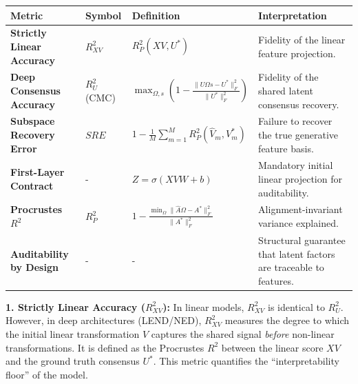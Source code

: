\documentclass[
  letterpaper,
]{report}
\newcounter{none} %
\begin{document}
{\def\LTcaptype{none} %
\begin{longtable}[]{@{}
  >{\raggedright\arraybackslash}p{}
  >{\centering\arraybackslash}p{}
  >{\raggedright\arraybackslash}p{}
  >{\raggedright\arraybackslash}p{}@{}}
\toprule\noalign{}
\begin{minipage}[b]{\linewidth}\raggedright
Metric
\end{minipage} & \begin{minipage}[b]{\linewidth}\centering
Symbol
\end{minipage} & \begin{minipage}[b]{\linewidth}\raggedright
Definition
\end{minipage} & \begin{minipage}[b]{\linewidth}\raggedright
Interpretation
\end{minipage} \\
\midrule\noalign{}
\endhead
\bottomrule\noalign{}
\endlastfoot
\textbf{Strictly Linear Accuracy} & \(R^2_{XV}\) & \(R^2_P(X V, U^*)\) &
Fidelity of the linear feature projection. \\
\textbf{Deep Consensus Accuracy} & \(R^2_U\) (CMC) &
\(\max_{\Omega, s} \left( 1 - \frac{\|\hat{U}\Omega s - U^*\|_F^2}{\|U^*\|_F^2} \right)\)
& Fidelity of the shared latent consensus recovery. \\
\textbf{Subspace Recovery Error} & \(SRE\) &
\(1 - \frac{1}{M} \sum_{m=1}^M R^2_P(\hat{V}_m, V^*_m)\) & Failure to
recover the true generative feature basis. \\
\textbf{First-Layer Contract} & - & \(Z = \sigma(X V W + b)\) &
Mandatory initial linear projection for auditability. \\
\textbf{Procrustes \(R^2\)} & \(R^2_P\) &
\(1 - \frac{\min_{\Omega} \|\hat{A}\Omega - A^*\|_F^2}{\|A^*\|_F^2}\) &
Alignment-invariant variance explained. \\
\textbf{Auditability by Design} & - & - & Structural guarantee that
latent factors are traceable to features. \\
\end{longtable}
}

\textbf{1. Strictly Linear Accuracy (\(R^2_{XV}\)):} In linear models,
\(R^2_{XV}\) is identical to \(R^2_U\). However, in deep architectures
(LEND/NED), \(R^2_{XV}\) measures the degree to which the initial linear
transformation \(V\) captures the shared signal \emph{before} non-linear
transformations. It is defined as the Procrustes \(R^2\) between the
linear score \(XV\) and the ground truth consensus \(U^*\). This metric
quantifies the ``interpretability floor'' of the model.
\end{document}
